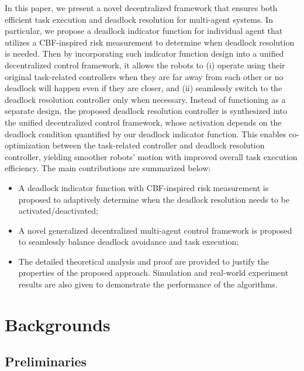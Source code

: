 \documentclass[letterpaper, 10 pt, conference]{ieeeconf}
\theoremstyle{plain}
\begin{document}
In this paper, we present a novel decentralized framework that ensures both efficient task execution and deadlock resolution for multi-agent systems. In particular, we propose a deadlock indicator function for individual agent that utilizes a
CBF-inspired risk measurement to determine when deadlock resolution is needed. Then by incorporating such indicator function design into a unified decentralized control framework, it allows the robots to (i) operate using their original task-related controllers when they are far away from each other or no deadlock will happen even if they are closer, and (ii) seamlessly switch to the deadlock resolution controller only when necessary.
Instead of functioning as a separate design, the proposed deadlock resolution controller is synthesized into the unified decentralized control framework, whose activation depends on the deadlock condition quantified by our deadlock indicator function. This enables co-optimization between the task-related controller and deadlock resolution controller, yielding smoother robots' motion with improved overall task execution efficiency.
The main contributions are summarized below:
\begin{itemize}
    \item A deadlock indicator function with CBF-inspired risk measurement is proposed to adaptively determine when the deadlock resolution needs to be activated/deactivated;
    \item A novel generalized decentralized multi-agent control framework is proposed to
    seamlessly balance deadlock avoidance and task execution;
    \item The detailed theoretical analysis and proof are provided to justify the properties of the proposed approach.
    Simulation and real-world experiment results are also given to demonstrate the performance of the algorithms.
\end{itemize}


\section{Backgrounds}
\subsection{Preliminaries}
\end{document}
